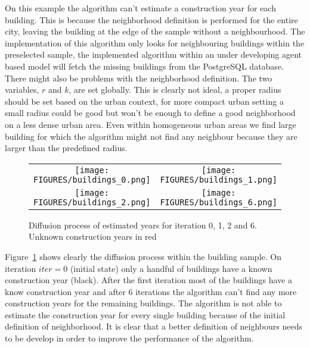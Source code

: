 On this example the algorithm can't estimate a construction year for each
building. This is because the neighborhood definition is performed for the
entire city, leaving the building at the edge of the sample without a
neighbourhood. The implementation of this algorithm only looks for neighbouring
buildings within the preselected sample, the implemented algorithm within an
under developing agent based model will fetch the missing buildings from the
PostgreSQL database. There might also be problems with the neighborhood
definition. The two variables, $r$ and $k$, are set globally. This is clearly
not ideal, a proper radius should be set based on the urban context, for more
compact urban setting a small radius could be good but won't be enough to
define a good neighborhood on a less dense urban area. Even within homogeneous
urban areas we find large building for which the algorithm might not find any
neighbour because they are larger than the predefined radius.\\

\begin{figure}[htpb]
    \centering
    \begin{tabular}{cc}
        \texttt{[image: FIGURES/buildings\_0.png]}&
        \texttt{[image: FIGURES/buildings\_1.png]}\\
        \texttt{[image: FIGURES/buildings\_2.png]}&
        \texttt{[image: FIGURES/buildings\_6.png]}\\
    \end{tabular}
    \caption{Diffusion process of estimated years for iteration 0, 1, 2 and 6.
        Unknown construction years in red}\label{fig:buildings}
\end{figure}

Figure~\ref{fig:buildings} shows clearly the diffusion process within the
building sample. On iteration $iter=0$ (initial state) only a handful of
buildings have a known construction year (black). After the first iteration
most of the buildings have a know construction year and after 6 iterations the
algorithm can't find any more construction years for the remaining buildings.
The algorithm is not able to estimate the construction year for every single
building because of the initial definition of neighborhood. It is clear that a
better definition of neighbours needs to be develop in order to improve the
performance of the algorithm.\\ 


